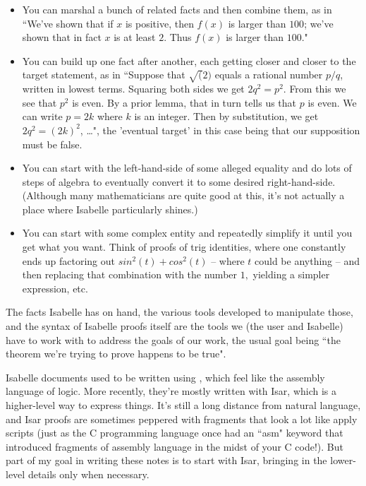 \begin{itemize}
    \item 
You can marshal a bunch of related facts and then combine them, as in ``We've shown that if $x$ is positive, then $f(x)$ is larger than $100$; we've shown that in fact $x$ is at least $2$. Thus $f(x)$ is larger than $100.$" 
\item
You can build up one fact after another, each getting closer and closer to the target statement, as in ``Suppose that $\sqrt(2)$ equals a rational number $p/q$, written in lowest terms. Squaring both sides we get $2q^2 = p^2.$ From this we see that $p^2$ is even. By a prior lemma, that in turn tells us that $p$ is even. We can write $p = 2k$ where $k$ is an integer. Then by substitution, we get $2q^2 = (2k)^2$, \ldots", the 'eventual target' in this case being that our supposition must be false. 
\item
You can start with the left-hand-side of some alleged equality and do lots of steps of algebra to eventually convert it to some desired right-hand-side. (Although many mathematicians are quite good at this, it's not actually a place where Isabelle particularly shines.) 
\item 
You can start with some complex entity and repeatedly simplify it until you get what you want. Think of proofs of trig identities, where one constantly ends up factoring out $sin^2(t) + cos^2(t)$  -- where $t$ could be anything --  and then replacing that combination with the number $1,$ yielding a simpler expression, etc.
\end{itemize}
The facts Isabelle has on hand, the various tools developed to manipulate those, and the syntax of Isabelle proofs itself are the tools we (the user and Isabelle) have to work with to address the goals of our work, the usual goal being ``the theorem we're trying to prove happens to be true". 

Isabelle documents used to be written using , which feel like the assembly language of logic. More recently, they're mostly written with Isar, which is a higher-level way to express things. It's still a long distance from natural language, and Isar proofs are sometimes peppered with fragments that look a lot like apply scripts (just as the C programming language once had an ``asm" keyword that introduced fragments of assembly language in the midst of your C code!). But part of my goal in writing these notes is to start with Isar, bringing in the lower-level details only when necessary. 

